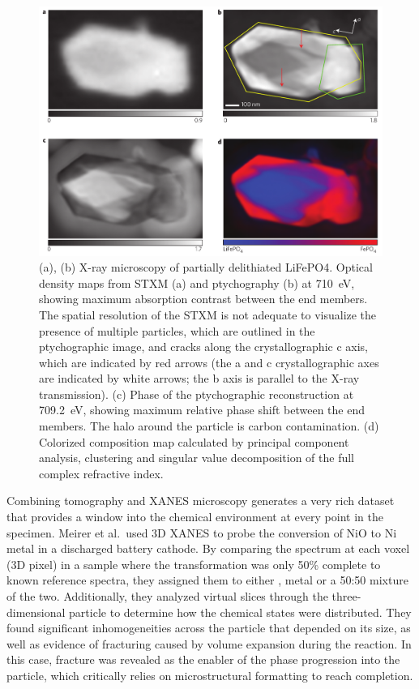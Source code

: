 \documentclass[journal=cmatex,manuscript=perspective]{achemso}
\begin{document}
\begin{figure}
  \includegraphics[width=\textwidth]{shapiro2014-2.png}
  \caption{(a), (b) X-ray microscopy of partially delithiated
    LiFePO4. Optical density maps from STXM (a) and ptychography (b)
    at \SI{710}{eV}, showing maximum absorption contrast between the end
    members. The spatial resolution of the STXM is not adequate to
    visualize the presence of multiple particles, which are outlined
    in the ptychographic image, and cracks along the crystallographic
    c axis, which are indicated by red arrows (the a and c
    crystallographic axes are indicated by white arrows; the b axis is
    parallel to the X-ray transmission). (c) Phase of the
    ptychographic reconstruction at \SI{709.2}{eV}, showing maximum relative
    phase shift between the end members. The halo around the particle
    is carbon contamination. (d) Colorized composition map calculated
    by principal component analysis, clustering and singular value
    decomposition of the full complex refractive index.\cite{shapiro2014}}
  \label{figure:shapiro2014-2}
\end{figure}

Combining tomography and XANES microscopy generates a very rich
dataset that provides a window into the chemical environment at every
point in the specimen. Meirer et al.\ used 3D XANES to probe the
conversion of NiO to Ni metal in a discharged battery
cathode\cite{meirer2011}. By comparing the spectrum at each voxel (3D
pixel) in a sample where the transformation was only 50\% complete to
known reference spectra, they assigned them to either ,  metal or
a 50:50 mixture of the two. Additionally, they analyzed virtual slices
through the three-dimensional particle to determine how the chemical
states were distributed. They found significant inhomogeneities across
the particle that depended on its size, as well as evidence of
fracturing caused by volume expansion during the reaction. In this
case, fracture was revealed as the enabler of the phase progression
into the particle, which critically relies on microstructural
formatting to reach completion.
\end{document}

